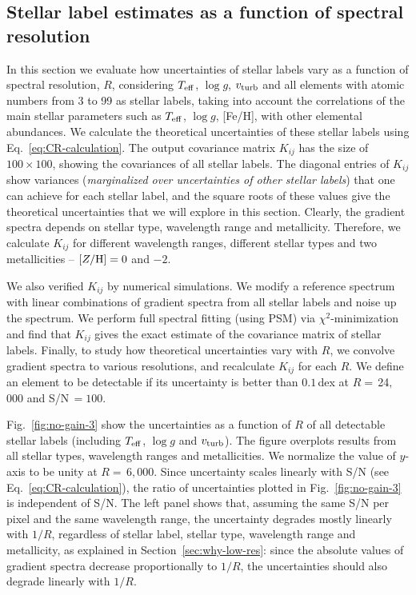 \documentclass[iop]{emulateapj}
\begin{document}
\begin{CJK*}{UTF8}{gbsn}
\subsection{Stellar label estimates as a function of spectral resolution}
\label{sec:uncertainty}

In this section we evaluate how uncertainties of stellar labels vary as a function of spectral resolution, $R$, considering $T_{\rm eff}$, $\log g$, $v_{\rm turb}$ and all elements with atomic numbers from 3 to 99 as stellar labels, taking into account the correlations of the main stellar parameters such as $T_{\rm eff}$, $\log g$, [Fe/H], with other elemental abundances. We calculate the theoretical uncertainties of these stellar labels using Eq.~\ref{eq:CR-calculation}. The output covariance matrix $K_{ij}$ has the size of $100 \times 100$, showing the covariances of all stellar labels. The diagonal entries of $K_{ij}$ show variances ({\em marginalized over uncertainties of other stellar labels}) that one can achieve for each stellar label, and the square roots of these values give the theoretical uncertainties that we will explore in this section. Clearly, the gradient spectra depends on stellar type, wavelength range and metallicity. Therefore, we calculate $K_{ij}$ for different wavelength ranges, different stellar types and two metallicities -- $[Z/{\rm H}] = 0$ and $-2$. 

We also verified $K_{ij}$ by numerical simulations. We modify a reference spectrum with linear combinations of gradient spectra from all stellar labels and noise up the spectrum. We perform full spectral fitting (using PSM) via $\chi^2$-minimization and find that $K_{ij}$ gives the exact estimate of the covariance matrix of stellar labels. Finally, to study how theoretical uncertainties vary with $R$, we convolve gradient spectra to various resolutions, and recalculate $K_{ij}$ for each $R$. We define an element to be detectable if its uncertainty is better than $0.1\,$dex at $R = \,$24$,$000 and S/N$\,=100$.

Fig.~\ref{fig:no-gain-3} show the uncertainties as a function of $R$ of all detectable stellar labels (including $T_{\rm eff}$, $\log g$ and $v_{\rm turb}$). The figure overplots results from all stellar types, wavelength ranges and metallicities. We normalize the value of $y$-axis to be unity at $R= \,$6$,$000. Since uncertainty scales linearly with S/N (see Eq.~\ref{eq:CR-calculation}), the ratio of uncertainties plotted in Fig.~\ref{fig:no-gain-3} is independent of S/N. The left panel shows that, assuming the same S/N per pixel and the same wavelength range, the uncertainty degrades mostly linearly with $1/R$, regardless of stellar label, stellar type, wavelength range and metallicity, as explained in Section~\ref{sec:why-low-res}: since the absolute values of gradient spectra decrease proportionally to $1/R$, the uncertainties should also degrade linearly with $1/R$. 


\end{CJK*}
\end{document}
